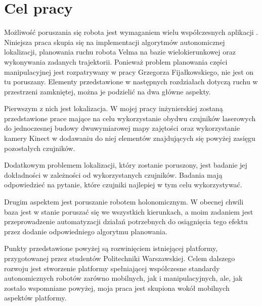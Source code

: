 \section{Cel pracy}
\label{cel_pracy}

Możliwość poruszania się robota jest wymaganiem wielu współczesnych aplikacji \cite{auto_slam}.  
Niniejsza praca skupia się na implementacji algorytmów autonomicznej lokalizacji, planowania ruchu robota Velma na bazie wielokierunkowej oraz wykonywania zadanych trajektorii. 
Ponieważ problem planowania części manipulacyjnej jest rozpatrywany w pracy Grzegorza Fijałkowskiego, nie jest on tu poruszany.
Elementy przedstawione w następnych rozdziałach dotyczą ruchu w przestrzeni zamkniętej, można je podzielić na dwa główne aspekty.

Pierwszym z nich jest lokalizacja.
W mojej pracy inżynierskiej zostaną przedstawione prace mające na celu wykorzystanie obydwu czujników laserowych do jednoczesnej budowy dwuwymiarowej mapy zajętości oraz wykorzystanie kamery Kinect w dodawaniu do niej elementów znajdujących się powyżej zasięgu pozostałych czujników. 

Dodatkowym problemem lokalizacji, który zostanie poruszony, jest badanie jej dokładności w zależności od wykorzystanych czujników.
Badania mają odpowiedzieć na pytanie, które czujniki najlepiej w tym celu wykorzystywać.

Drugim aspektem jest poruszanie robotem holonomicznym. W obecnej chwili baza jest w stanie poruszać się we wszystkich kierunkach, a moim zadaniem jest przeprowadzenie automatyzacji działań potrzebnych do osiągnięcia tego efektu przez dodanie odpowiedniego algorytmu planowania.

Punkty przedstawione powyżej są rozwinięciem istniejącej platformy, przygotowanej przez studentów Politechniki Warszawskiej.
Celem dalszego rozwoju jest stworzenie platformy spełniającej współczesne standardy autonomicznych robotów zarówno mobilnych, jak i manipulacyjnych, ale, jak zostało wspomniane powyżej, moja praca jest skupiona wokół mobilnych aspektów platformy.
